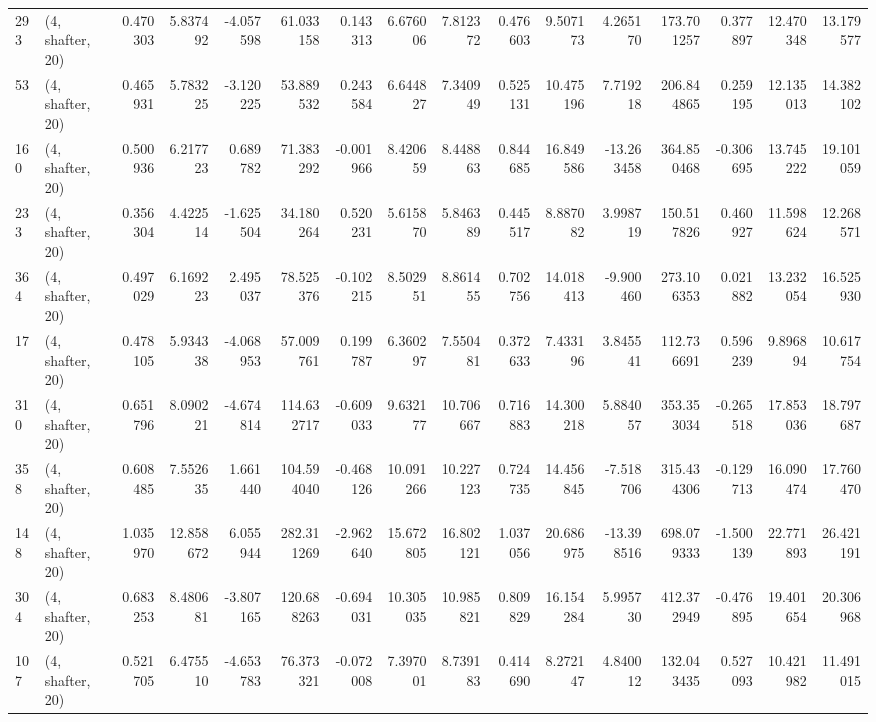 \begin{tabular}{llrrrrrrrrrrrrrr}
293 &  (4, shafter, 20) &   0.470303 &   5.837492 &  -4.057598 &    61.033158 &   0.143313 &   6.676006 &   7.812372 &  0.476603 &   9.507173 &   4.265170 &   173.701257 &   0.377897 &  12.470348 &  13.179577 \\
53  &  (4, shafter, 20) &   0.465931 &   5.783225 &  -3.120225 &    53.889532 &   0.243584 &   6.644827 &   7.340949 &  0.525131 &  10.475196 &   7.719218 &   206.844865 &   0.259195 &  12.135013 &  14.382102 \\
160 &  (4, shafter, 20) &   0.500936 &   6.217723 &   0.689782 &    71.383292 &  -0.001966 &   8.420659 &   8.448863 &  0.844685 &  16.849586 & -13.263458 &   364.850468 &  -0.306695 &  13.745222 &  19.101059 \\
233 &  (4, shafter, 20) &   0.356304 &   4.422514 &  -1.625504 &    34.180264 &   0.520231 &   5.615870 &   5.846389 &  0.445517 &   8.887082 &   3.998719 &   150.517826 &   0.460927 &  11.598624 &  12.268571 \\
364 &  (4, shafter, 20) &   0.497029 &   6.169223 &   2.495037 &    78.525376 &  -0.102215 &   8.502951 &   8.861455 &  0.702756 &  14.018413 &  -9.900460 &   273.106353 &   0.021882 &  13.232054 &  16.525930 \\
17  &  (4, shafter, 20) &   0.478105 &   5.934338 &  -4.068953 &    57.009761 &   0.199787 &   6.360297 &   7.550481 &  0.372633 &   7.433196 &   3.845541 &   112.736691 &   0.596239 &   9.896894 &  10.617754 \\
310 &  (4, shafter, 20) &   0.651796 &   8.090221 &  -4.674814 &   114.632717 &  -0.609033 &   9.632177 &  10.706667 &  0.716883 &  14.300218 &   5.884057 &   353.353034 &  -0.265518 &  17.853036 &  18.797687 \\
358 &  (4, shafter, 20) &   0.608485 &   7.552635 &   1.661440 &   104.594040 &  -0.468126 &  10.091266 &  10.227123 &  0.724735 &  14.456845 &  -7.518706 &   315.434306 &  -0.129713 &  16.090474 &  17.760470 \\
148 &  (4, shafter, 20) &   1.035970 &  12.858672 &   6.055944 &   282.311269 &  -2.962640 &  15.672805 &  16.802121 &  1.037056 &  20.686975 & -13.398516 &   698.079333 &  -1.500139 &  22.771893 &  26.421191 \\
304 &  (4, shafter, 20) &   0.683253 &   8.480681 &  -3.807165 &   120.688263 &  -0.694031 &  10.305035 &  10.985821 &  0.809829 &  16.154284 &   5.995730 &   412.372949 &  -0.476895 &  19.401654 &  20.306968 \\
107 &  (4, shafter, 20) &   0.521705 &   6.475510 &  -4.653783 &    76.373321 &  -0.072008 &   7.397001 &   8.739183 &  0.414690 &   8.272147 &   4.840012 &   132.043435 &   0.527093 &  10.421982 &  11.491015 \\

\end{tabular}
